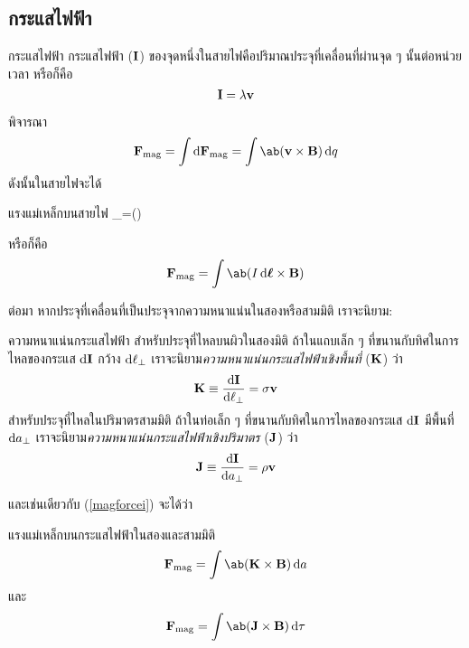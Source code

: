 \subsection{กระแสไฟฟ้า}
\begin{defbox}{กระแสไฟฟ้า}
    กระแสไฟฟ้า ($\mathbf{I}$) ของจุดหนึ่งในสายไฟคือปริมาณประจุที่เคลื่อนที่ผ่านจุด ๆ นั้นต่อหน่วยเวลา หรือก็คือ
    \begin{equation}
        \mathbf{I} = \lambda\mathbf{v}
    \end{equation}
\end{defbox}
พิจารณา
\[\vF_\txt{mag}=\int\odif{\vF_\txt{mag}}=\int\ab(\vv\times\vB)\odif{q}\]
ดังนั้นในสายไฟจะได้
\begin{eqbox}{แรงแม่เหล็กบนสายไฟ}
    \vF_=\int\ab(\vI\times\vB)\odif{\ell}\label{magforcei}
\end{eqbox}
หรือก็คือ
\begin{equation}
    \vF_\txt{mag}=\int\ab(I\odif{\vl}\times\vB)
\end{equation}

ต่อมา หากประจุที่เคลื่อนที่เป็นประจุจากความหนาแน่นในสองหรือสามมิติ เราจะนิยาม:
\begin{defbox}{ความหนาแน่นกระแสไฟฟ้า}
    สำหรับประจุที่ไหลบนผิวในสองมิติ ถ้าในแถบเล็ก ๆ ที่ขนานกับทิศในการไหลของกระแส $\odif{\vI}$ กว้าง $\odif{\ell_\perp}$ เราจะนิยาม\emph{ความหนาแน่นกระแสไฟฟ้าเชิงพื้นที่} ($\mathbf{K}$) ว่า
    \begin{equation}
        \vK\equiv\frac{\odif{\vI}}{\odif{\ell_\perp}}=\sigma\vv
    \end{equation}
    สำหรับประจุที่ไหลในปริมาตรสามมิติ ถ้าในท่อเล็ก ๆ ที่ขนานกับทิศในการไหลของกระแส $\odif{\vI}$ มีพื้นที่ $\odif{a_\perp}$ เราจะนิยาม\emph{ความหนาแน่นกระแสไฟฟ้าเชิงปริมาตร} ($\mathbf{J}$) ว่า
    \begin{equation}
        \vJ\equiv\frac{\odif{\vI}}{\odif{a_\perp}}=\rho\vv
    \end{equation}
\end{defbox}
และเช่นเดียวกับ (\ref{magforcei}) จะได้ว่า
\begin{corbox}{แรงแม่เหล็กบนกระแสไฟฟ้าในสองและสามมิติ}
    \begin{equation}
        \vF_\txt{mag}=\int\ab(\vK\times\vB)\odif{a}
    \end{equation}
    และ
    \begin{equation}
        \vF_\txt{mag}=\int\ab(\vJ\times\vB)\odif{\tau}
    \end{equation}
\end{corbox}
